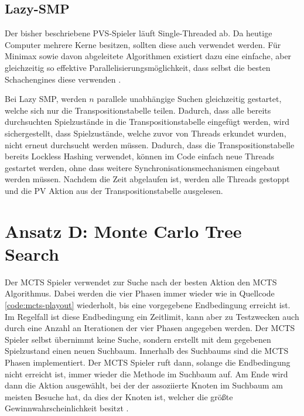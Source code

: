 \pagebreak

\subsection{Lazy-SMP}

Der bisher beschriebene \ac{PVS}-Spieler läuft Single-Threaded ab. Da heutige Computer mehrere Kerne besitzen, sollten diese auch verwendet werden. Für Minimax sowie davon abgeleitete Algorithmen existiert dazu eine einfache, aber gleichzeitig so effektive Parallelisierungsmöglichkeit, dass selbst die besten Schachengines diese verwenden \cite{2016.Stockfish7} \cite[S. 52]{2016.ParallelChessEngine}.

Bei Lazy \ac{SMP}, werden $n$ parallele unabhängige Suchen gleichzeitig gestartet, welche sich nur die Transpositionstabelle teilen. Dadurch, dass alle bereits durchsuchten Spielzustände in die Transpositionstabelle eingefügt werden, wird sichergestellt, dass Spielzustände, welche zuvor von Threads erkundet wurden, nicht erneut durchsucht werden müssen. Dadurch, dass die Transpositionstabelle bereits Lockless Hashing verwendet, können im Code einfach neue Threads gestartet werden, ohne dass weitere Synchronisationsmechanismen eingebaut werden müssen. Nachdem die Zeit abgelaufen ist, werden alle Threads gestoppt und die \ac{PV} Aktion aus der Transpositionstabelle ausgelesen.

\pagebreak

\section{Ansatz D: Monte Carlo Tree Search}
\label{section:erstellung-ansatz-c}

Der \ac{MCTS} Spieler verwendet zur Suche nach der besten Aktion den \acl{MCTS} Algorithmus. Dabei werden die vier Phasen immer wieder wie in Quellcode \ref{code:mcts-playout} wiederholt, bis eine vorgegebene Endbedingung erreicht ist. Im Regelfall ist diese Endbedingung ein Zeitlimit, kann aber zu Testzwecken auch durch eine Anzahl an Iterationen der vier Phasen angegeben werden. Der \ac{MCTS} Spieler selbst übernimmt keine Suche, sondern erstellt mit dem gegebenen Spielzustand einen neuen Suchbaum. Innerhalb des Suchbaums sind die \ac{MCTS} Phasen implementiert. Der \ac{MCTS} Spieler ruft dann, solange die Endbedingung nicht erreicht ist, immer wieder die  Methode im Suchbaum auf. Am Ende wird dann die Aktion ausgewählt, bei der der assoziierte Knoten im Suchbaum am meisten Besuche hat, da dies der Knoten ist, welcher die größte Gewinnwahrscheinlichkeit besitzt \cite[S. 217]{2008.MCTS}.

